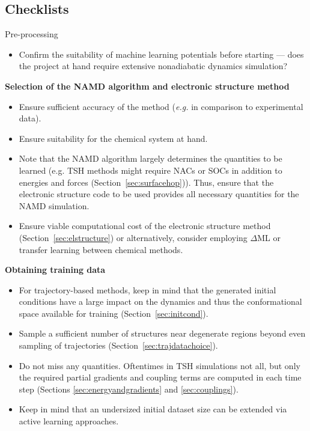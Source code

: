 \documentclass[9pt,bestpractices]{livecoms}
\begin{document}
\begin{Checklists*}[p!]
\section{Checklists}

\begin{checklist}{Pre-processing}
\begin{itemize}
\item Confirm the suitability of machine learning potentials before starting --- does the project at hand require extensive nonadiabatic dynamics simulation?
\end{itemize}

\textbf{Selection of the NAMD algorithm and electronic structure method}
\begin{itemize}
\item Ensure sufficient accuracy of the method (\textit{e.g.} in comparison to experimental data).
\item Ensure suitability for the chemical system at hand.
\item Note that the NAMD algorithm largely determines the quantities to be learned (e.g. TSH methods might require NACs or SOCs in addition to energies and forces (Section~\ref{sec:surfacehop})).
Thus, ensure that the electronic structure code to be used provides all necessary quantities for the NAMD simulation.
\item Ensure viable computational cost of the electronic structure method (Section~\ref{sec:elstructure}) or alternatively, consider employing $\Delta$ML or transfer learning between chemical methods.
\end{itemize}

\textbf{Obtaining training data}
\begin{itemize}
\item For trajectory-based methods, keep in mind that the generated initial conditions have a large impact on the dynamics and thus the conformational space available for training (Section~\ref{sec:initcond}).
\item Sample a sufficient number of structures near degenerate regions beyond even sampling of trajectories (Section~\ref{sec:trajdatachoice}).
\item Do not miss any quantities. Oftentimes in TSH simulations not all, but only the required partial gradients and coupling terms are computed in each time step (Sections \ref{sec:energyandgradients} and \ref{sec:couplings}).
\item Keep in mind that an undersized initial dataset size can be extended via active learning approaches.
\end{itemize}
\end{checklist}




\end{Checklists*}
\end{document}
